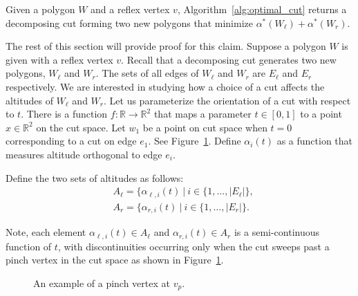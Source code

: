 \documentclass[../main.tex]{subfiles}
\begin{document}
\begin{claim}
Given a polygon $W$ and a reflex vertex $v$, Algorithm~\ref{alg:optimal_cut} returns a decomposing cut forming two new polygons that minimize $\alpha^*(W_{\ell})+\alpha^*(W_r)$.
\end{claim}

The rest of this section will provide proof for this claim. Suppose a polygon $W$ is given with a reflex vertex $v$. Recall that a decomposing cut generates two new polygons, $W_{\ell}$ and $W_r$. The sets of all edges of $W_{\ell}$ and $W_r$ are $E_{\ell}$ and $E_r$ respectively. We are interested in studying how a choice of a cut affects the altitudes of $W_{\ell}$ and $W_r$. Let us parameterize the orientation of a cut with respect to $t$. There is a function $f:\mathbb{R}\to\mathbb{R}^2$ that maps a parameter $t\in[0,1]$ to a point $x\in\mathbb{R}^2$ on the cut space. Let $w_1$ be a point on cut space when $t=0$ corresponding to a cut on edge $e_1$. See Figure~\ref{fig:pinch_vertex}. Define $\alpha_i(t)$ as a function that measures altitude orthogonal to edge $e_i$.

Define the two sets of altitudes as follows:
\begin{equation}
\begin{aligned}
\label{eq:set_of_altitudes}
	&A_{\ell}=\{\alpha_{\ell,i}(t)\ |\ i\in\{1,\ldots,|E_{\ell}|\},\\
	&A_{r}=\{\alpha_{r,i}(t)\ |\ i\in\{1,\ldots,|E_r|\}.
\end{aligned}
\end{equation}

Note, each element $\alpha_{\ell,i}(t)\in A_{\ell}$ and $\alpha_{r,i}(t)\in A_r$ is a semi-continuous function of $t$, with discontinuities occurring only when the cut sweeps past a pinch vertex in the cut space as shown in Figure~\ref{fig:pinch_vertex}.

\begin{figure}
	\centering
	
	\caption{An example of a pinch vertex at $v_p$.}
	\label{fig:pinch_vertex}
\end{figure}
\end{document}
